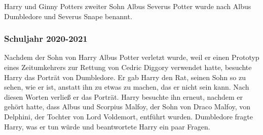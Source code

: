 \documentclass[a4paper, 10pt]{article}
\begin{document}
\vspace{10pt}
\newline
Harry und Ginny Potters zweiter Sohn Albus Severus Potter wurde nach Albus Dumbledore und Severus Snape benannt.
\subsubsection*{Schuljahr 2020-2021}
Nachdem der Sohn von Harry Albus Potter verletzt wurde, weil er einen Prototyp eines Zeitumkehrers zur Rettung von Cedric Diggory verwendet hatte, besuchte Harry das Porträt von Dumbledore. Er gab Harry den Rat, seinen Sohn so zu sehen, wie er ist, anstatt ihn zu etwas zu machen, das er nicht sein kann. Nach diesen Worten verließ er das Porträt.
\vspace{10pt}
\newline
Harry besuchte ihn erneut, nachdem er gehört hatte, dass Albus und Scorpius Malfoy, der Sohn von Draco Malfoy, von Delphini, der Tochter von Lord Voldemort, entführt wurden. Dumbledore fragte Harry, was er tun würde und beantwortete Harry ein paar Fragen.
\end{document}
